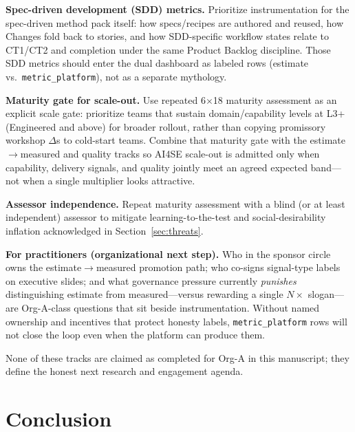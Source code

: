 \documentclass[10pt,conference]{IEEEtran}
\begin{document}
\textbf{Spec-driven development (SDD) metrics.}
Prioritize instrumentation for the spec-driven method pack itself: how specs/recipes are authored and reused, how Changes fold back to stories, and how SDD-specific workflow states relate to CT1/CT2 and completion under the same Product Backlog discipline.
Those SDD metrics should enter the dual dashboard as labeled rows (estimate vs.\ \texttt{metric\_platform}), not as a separate mythology.

\textbf{Maturity gate for scale-out.}
Use repeated 6$\times$18 maturity assessment as an explicit scale gate: prioritize teams that sustain domain/capability levels at L3+ (Engineered and above) for broader rollout, rather than copying promissory workshop $\Delta$s to cold-start teams.
Combine that maturity gate with the estimate$\rightarrow$measured and quality tracks so AI4SE scale-out is admitted only when capability, delivery signals, and quality jointly meet an agreed expected band---not when a single multiplier looks attractive.

\textbf{Assessor independence.}
Repeat maturity assessment with a blind (or at least independent) assessor to mitigate learning-to-the-test and social-desirability inflation acknowledged in Section~\ref{sec:threats}.

\textbf{For practitioners (organizational next step).}
Who in the sponsor circle owns the estimate$\rightarrow$measured promotion path; who co-signs signal-type labels on executive slides; and what governance pressure currently \emph{punishes} distinguishing estimate from measured---versus rewarding a single $N\times$ slogan---are Org-A-class questions that sit beside instrumentation.
Without named ownership and incentives that protect honesty labels, \texttt{metric\_platform} rows will not close the loop even when the platform can produce them.

None of these tracks are claimed as completed for Org-A in this manuscript; they define the honest next research and engagement agenda.

\section{Conclusion}
\label{sec:conclusion}
\end{document}
